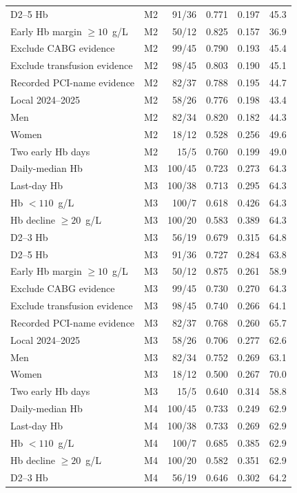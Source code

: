 \documentclass[pdflatex,sn-vancouver-num]{sn-jnl}
\begin{document}
\begin{longtable}{p{4.4cm}lrrrr}
D2--5 Hb & M2 & 91/36 & 0.771 & 0.197 & 45.3\\
Early Hb margin $\geq 10$~g/L & M2 & 50/12 & 0.825 & 0.157 & 36.9\\
Exclude CABG evidence & M2 & 99/45 & 0.790 & 0.193 & 45.4\\
Exclude transfusion evidence & M2 & 98/45 & 0.803 & 0.190 & 45.1\\
Recorded PCI-name evidence & M2 & 82/37 & 0.788 & 0.195 & 44.7\\
Local 2024--2025 & M2 & 58/26 & 0.776 & 0.198 & 43.4\\
Men & M2 & 82/34 & 0.820 & 0.182 & 44.3\\
Women & M2 & 18/12 & 0.528 & 0.256 & 49.6\\
Two early Hb days & M2 & 15/5 & 0.760 & 0.199 & 49.0\\
Daily-median Hb & M3 & 100/45 & 0.723 & 0.273 & 64.3\\
Last-day Hb & M3 & 100/38 & 0.713 & 0.295 & 64.3\\
Hb $<110$~g/L & M3 & 100/7 & 0.618 & 0.426 & 64.3\\
Hb decline $\geq 20$~g/L & M3 & 100/20 & 0.583 & 0.389 & 64.3\\
D2--3 Hb & M3 & 56/19 & 0.679 & 0.315 & 64.8\\
D2--5 Hb & M3 & 91/36 & 0.727 & 0.284 & 63.8\\
Early Hb margin $\geq 10$~g/L & M3 & 50/12 & 0.875 & 0.261 & 58.9\\
Exclude CABG evidence & M3 & 99/45 & 0.730 & 0.270 & 64.3\\
Exclude transfusion evidence & M3 & 98/45 & 0.740 & 0.266 & 64.1\\
Recorded PCI-name evidence & M3 & 82/37 & 0.768 & 0.260 & 65.7\\
Local 2024--2025 & M3 & 58/26 & 0.706 & 0.277 & 62.6\\
Men & M3 & 82/34 & 0.752 & 0.269 & 63.1\\
Women & M3 & 18/12 & 0.500 & 0.267 & 70.0\\
Two early Hb days & M3 & 15/5 & 0.640 & 0.314 & 58.8\\
Daily-median Hb & M4 & 100/45 & 0.733 & 0.249 & 62.9\\
Last-day Hb & M4 & 100/38 & 0.733 & 0.269 & 62.9\\
Hb $<110$~g/L & M4 & 100/7 & 0.685 & 0.385 & 62.9\\
Hb decline $\geq 20$~g/L & M4 & 100/20 & 0.582 & 0.351 & 62.9\\
D2--3 Hb & M4 & 56/19 & 0.646 & 0.302 & 64.2\\

\end{longtable}
\end{document}
